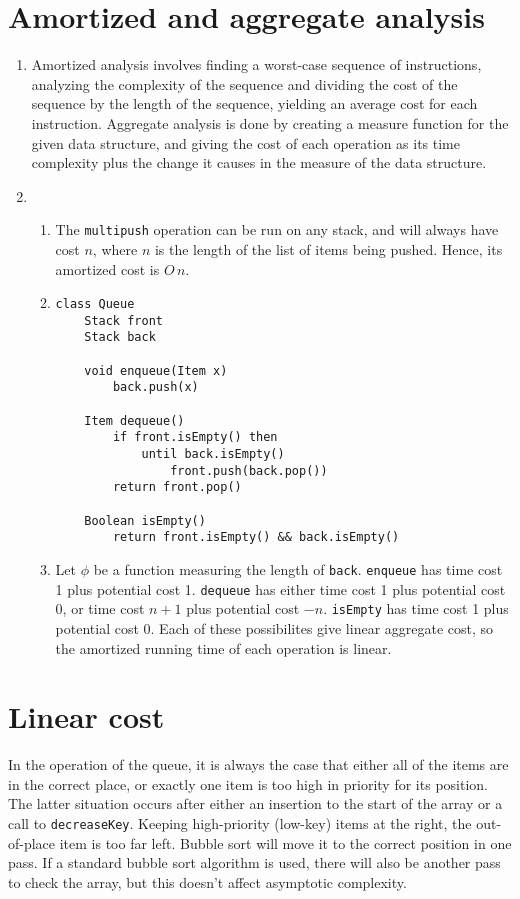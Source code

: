 \documentclass[11pt]{article}
\begin{document}
\section{Amortized and aggregate analysis}
\begin{enumerate}
\item Amortized analysis involves finding a worst-case sequence of instructions, analyzing the complexity of the sequence and dividing the cost of the sequence by the length of the sequence, yielding an average cost for each instruction. Aggregate analysis is done by creating a measure function for the given data structure, and giving the cost of each operation as its time complexity plus the change it causes in the measure of the data structure.
\item
  \begin{enumerate}
  \item The \texttt{multipush} operation can be run on any stack, and will always have cost \(n\), where \(n\) is the length of the list of items being pushed. Hence, its amortized cost is \(O\,n\).
  \item
    \begin{minipage}[t]{\linewidth}
      \begin{lstlisting}
class Queue
    Stack front
    Stack back

    void enqueue(Item x)
        back.push(x)

    Item dequeue()
        if front.isEmpty() then
            until back.isEmpty()
                front.push(back.pop())
        return front.pop()

    Boolean isEmpty()
        return front.isEmpty() && back.isEmpty()
      \end{lstlisting}
    \end{minipage}
  \item Let \(\phi\) be a function measuring the length of \texttt{back}. \texttt{enqueue} has time cost 1 plus potential cost 1. \texttt{dequeue} has either time cost 1 plus potential cost 0, or time cost \(n+1\) plus potential cost \(-n\). \texttt{isEmpty} has time cost 1 plus potential cost 0. Each of these possibilites give linear aggregate cost, so the amortized running time of each operation is linear.
  \end{enumerate}
\end{enumerate}

\section{Linear cost}
In the operation of the queue, it is always the case that either all of the items are in the correct place, or exactly one item is too high in priority for its position. The latter situation occurs after either an insertion to the start of the array or a call to \texttt{decreaseKey}. Keeping high-priority (low-key) items at the right, the out-of-place item is too far left. Bubble sort will move it to the correct position in one pass. If a standard bubble sort algorithm is used, there will also be another pass to check the array, but this doesn't affect asymptotic complexity.
\end{document}
